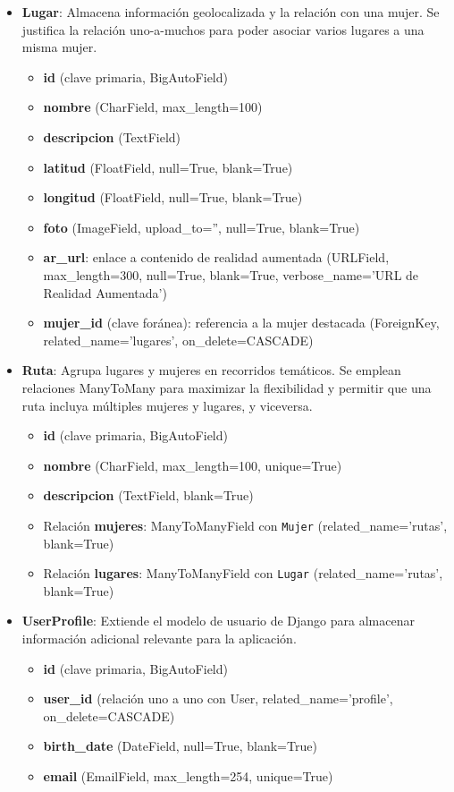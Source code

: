 \begin{itemize}
    \item \textbf{Lugar}: Almacena información geolocalizada y la relación con una mujer. Se justifica la relación uno-a-muchos para poder asociar varios lugares a una misma mujer.
    \begin{itemize}
        \item \textbf{id} (clave primaria, BigAutoField)
        \item \textbf{nombre} (CharField, max\_length=100)
        \item \textbf{descripcion} (TextField)
        \item \textbf{latitud} (FloatField, null=True, blank=True)
        \item \textbf{longitud} (FloatField, null=True, blank=True)
        \item \textbf{foto} (ImageField, upload\_to='', null=True, blank=True)
        \item \textbf{ar\_url}: enlace a contenido de realidad aumentada (URLField, max\_length=300, null=True, blank=True, verbose\_name='URL de Realidad Aumentada')
        \item \textbf{mujer\_id} (clave foránea): referencia a la mujer destacada (ForeignKey, related\_name='lugares', on\_delete=CASCADE)
    \end{itemize}
    
    \item \textbf{Ruta}: Agrupa lugares y mujeres en recorridos temáticos. Se emplean relaciones ManyToMany para maximizar la flexibilidad y permitir que una ruta incluya múltiples mujeres y lugares, y viceversa.
    \begin{itemize}
        \item \textbf{id} (clave primaria, BigAutoField)
        \item \textbf{nombre} (CharField, max\_length=100, unique=True)
        \item \textbf{descripcion} (TextField, blank=True)
        \item Relación \textbf{mujeres}: ManyToManyField con \texttt{Mujer} (related\_name='rutas', blank=True)
        \item Relación \textbf{lugares}: ManyToManyField con \texttt{Lugar} (related\_name='rutas', blank=True)
    \end{itemize}
    
    \item \textbf{UserProfile}: Extiende el modelo de usuario de Django para almacenar información adicional relevante para la aplicación.
    \begin{itemize}
        \item \textbf{id} (clave primaria, BigAutoField)
        \item \textbf{user\_id} (relación uno a uno con User, related\_name='profile', on\_delete=CASCADE)
        \item \textbf{birth\_date} (DateField, null=True, blank=True)
        \item \textbf{email} (EmailField, max\_length=254, unique=True)
    \end{itemize}
    

\end{itemize}
